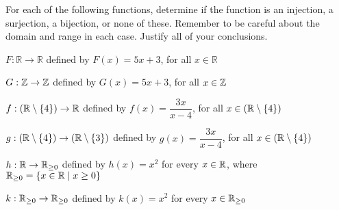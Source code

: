 \item \label{exer:forexample} For each of the following functions, determine if the function is an injection, a surjection, a bijection, or none of these. Remember to be careful about the domain and range in each case. Justify all of your conclusions.
\ba
\item $F:\mathbb{R} \to \mathbb{R}$  defined by  $F( x ) = 5x + 3$, for all  $x \in \mathbb{R}$  

\item $G:\mathbb{Z} \to \mathbb{Z}$  defined by  $G( x ) = 5x + 3$, for all  $x \in \mathbb{Z}$

\item $f: ( \mathbb{R} \setminus \left\{ 4 \right\} ) \to \mathbb{R}$ defined  by $f ( x ) = \dfrac{3x}{x - 4}$, for all 
          $x \in \left( \mathbb{R} \setminus\{ 4 \} \right)$  

\item $g: ( \mathbb{R} \setminus \left\{ 4 \right\} ) \to ( \mathbb{R} \setminus \left\{ 3 \right\} )$ defined by $g ( x ) = \dfrac{3x}{x - 4}$,  for all $x \in \left( \mathbb{R} \setminus \{ 4 \} \right)$   

\item $h: \mathbb{R} \to \mathbb{R}_{\geq 0}$ defined by $h(x) = x^2$ for every $x \in \mathbb{R}$, where $\mathbb{R}_{\geq 0} = \{x \in \mathbb{R} \mid x \geq 0\}$

\item $k: \mathbb{R}_{\geq 0} \to \mathbb{R}_{\geq 0}$ defined by $k(x) = x^2$ for every $x \in \mathbb{R}_{\geq 0}$


\ea

